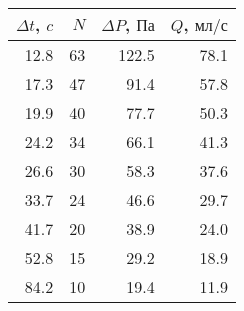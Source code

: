 \begin{tabular}{rrrr}
\toprule
$\Delta t$, $c$ & $N$ & $\Delta P$, $Па$ & $Q$, $мл/с$ \\
\midrule
12.8 & 63 & 122.5 & 78.1 \\
17.3 & 47 & 91.4 & 57.8 \\
19.9 & 40 & 77.7 & 50.3 \\
24.2 & 34 & 66.1 & 41.3 \\
26.6 & 30 & 58.3 & 37.6 \\
33.7 & 24 & 46.6 & 29.7 \\
41.7 & 20 & 38.9 & 24.0 \\
52.8 & 15 & 29.2 & 18.9 \\
84.2 & 10 & 19.4 & 11.9 \\
\bottomrule
\end{tabular}
